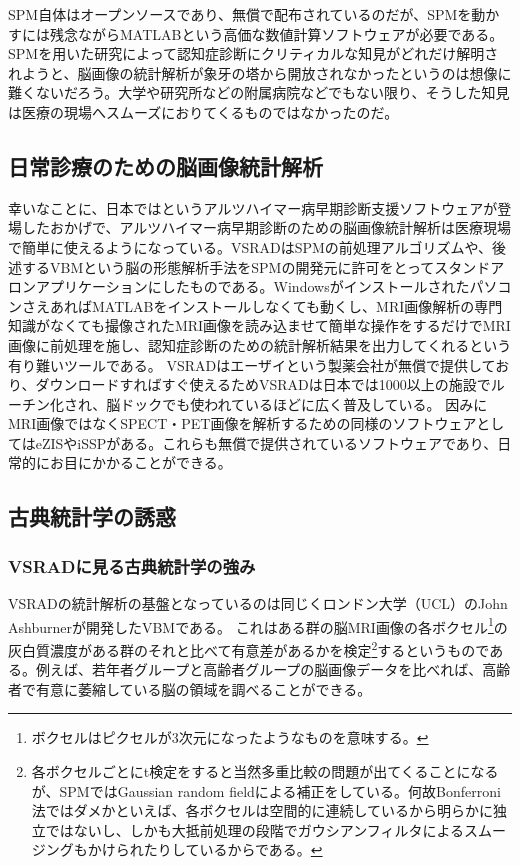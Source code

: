 SPM自体はオープンソースであり、無償で配布されているのだが、SPMを動かすには残念ながらMATLABという高価な数値計算ソフトウェアが必要である。SPMを用いた研究によって認知症診断にクリティカルな知見がどれだけ解明されようと、脳画像の統計解析が象牙の塔から開放されなかったというのは想像に難くないだろう。大学や研究所などの附属病院などでもない限り、そうした知見は医療の現場へスムーズにおりてくるものではなかったのだ。
\subsection{日常診療のための脳画像統計解析}
幸いなことに、日本ではというアルツハイマー病早期診断支援ソフトウェアが登場したおかげで、アルツハイマー病早期診断のための脳画像統計解析は医療現場で簡単に使えるようになっている。VSRADはSPMの前処理アルゴリズムや、後述するVBMという脳の形態解析手法をSPMの開発元に許可をとってスタンドアロンアプリケーションにしたものである。WindowsがインストールされたパソコンさえあればMATLABをインストールしなくても動くし、MRI画像解析の専門知識がなくても撮像されたMRI画像を読み込ませて簡単な操作をするだけでMRI画像に前処理を施し、認知症診断のための統計解析結果を出力してくれるという有り難いツールである。
VSRADはエーザイという製薬会社が無償で提供しており、ダウンロードすればすぐ使えるためVSRADは日本では1000以上の施設でルーチン化され、脳ドックでも使われているほどに広く普及している。
因みにMRI画像ではなくSPECT・PET画像を解析するための同様のソフトウェアとしてはeZISやiSSPがある。これらも無償で提供されているソフトウェアであり、日常的にお目にかかることができる。

\subsection{古典統計学の誘惑}
\subsubsection{VSRADに見る古典統計学の強み}
VSRADの統計解析の基盤となっているのは同じくロンドン大学（UCL）のJohn Ashburnerが開発したVBMである。
これはある群の脳MRI画像の各ボクセル\footnote{ボクセルはピクセルが3次元になったようなものを意味する。}の灰白質濃度がある群のそれと比べて有意差があるかを検定\footnote{各ボクセルごとにt検定をすると当然多重比較の問題が出てくることになるが、SPMではGaussian random fieldによる補正をしている。何故Bonferroni法ではダメかといえば、各ボクセルは空間的に連続しているから明らかに独立ではないし、しかも大抵前処理の段階でガウシアンフィルタによるスムージングもかけられたりしているからである。}するというものである。例えば、若年者グループと高齢者グループの脳画像データを比べれば、高齢者で有意に萎縮している脳の領域を調べることができる。

